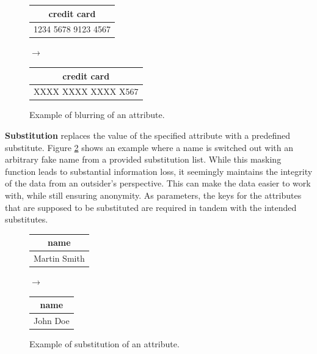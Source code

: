 \bigskip

\begin{figure}[ht]
    \begin{center}
    \footnotesize{
        \renewcommand{\arraystretch}{1.5}
        \begin{tabular}{|c|}
            \hline
            credit card \\
            \hline
            1234 5678 9123 4567 \\
            \hline
            \end{tabular}
            \quad $\longrightarrow$ \quad
            \begin{tabular}{|c|}
            \hline
            credit card \\
            \hline
            XXXX XXXX XXXX X567 \\
            \hline
        \end{tabular}
    }
    \end{center}
    \caption{Example of blurring of an attribute.\label{fig:blurring}}
\end{figure}

\textbf{Substitution} replaces the value of the specified attribute with a predefined substitute. Figure \ref{fig:substitution} shows an example where a name is switched out with an arbitrary fake name from a provided substitution list. While this masking function leads to substantial information loss, it seemingly maintains the integrity of the data from an outsider's perspective. This can make the data easier to work with, while still ensuring anonymity. As parameters, the keys for the attributes that are supposed to be substituted are required in tandem with the intended substitutes. 

\bigskip

\begin{figure}[ht]
    \begin{center}
    \footnotesize{
        \renewcommand{\arraystretch}{1.5}
        \begin{tabular}{|c|}
            \hline
            name \\
            \hline
            Martin Smith \\
            \hline
            \end{tabular}
            \quad $\longrightarrow$ \quad
            \begin{tabular}{|c|}
            \hline
            name \\
            \hline
            John Doe \\
            \hline
        \end{tabular}
    }
    \end{center}
    \caption{Example of substitution of an attribute.\label{fig:substitution}}
\end{figure}

